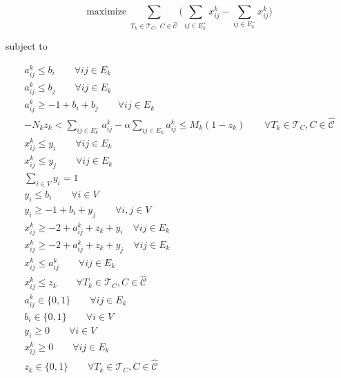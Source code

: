 \begin{equation}
	\label{eq:d-ecp-objective}
	\text{maximize} \; \sum_{ T_{k} \in \mathcal{T}_{C}, \; C \in
		\mathcal{\hat{C}} } \big( \sum^{}_{ij \in E^+_k} x_{ij}
	^{k} - \sum_{ij \in E^-_k} x_{ij} ^{k} \big)
\end{equation} \begin{center} subject to \end{center}
\begin{gather}
	\label{eq:d-ecp-a-ij-l-bi}
	a_{ij}^{k} \leq b_{i} \quad\quad \forall ij \in E_k \\
	\label{eq:d-ecp-a-ij-l-bj}
	a_{ij}^{k} \leq b_{j} \quad\quad \forall ij \in E_k \\
	\label{eq:d-ecp-a-ij-g-ijk}
	a _{ij} ^{k} \geq - 1 + b_i + b_j \quad\quad \forall ij \in E_k \\
	\label{eq:d-ecp-alpha-constraint}
	-N_{k} z_k < \sum^{}_{ij \in E^-_k} a_{ij}^{k}  - \alpha \sum^{}_{ij \in E_k}
	a_{ij} ^{k}  \leq M_k (1 - z_k) \quad\quad \forall T_{k} \in \mathcal{T} _{C}, C \in
	\hat{\mathcal{C}}\\
	\label{eq:d-ecp-edge-charikar1}
	x _{ij}^{k}  \leq y_i \quad\quad \forall ij \in E_{k} \\
	\label{eq:d-ecp-edge-charikar2}
	x _{ij} ^{k} \leq y_j \quad\quad \forall ij \in E_k \\
	\label{eq:d-ecp-vertex-charikar1}
	\sum^{}_{i \in V} y_i = 1 \\
	\label{eq:d-ecp-vertex-l-b}
	y_i \leq b_i \quad\quad \forall i \in V \\
	\label{eq:d-ecp-vertex-g-bi-yj}
	y_i \geq -1 + b_i + y_j \quad\quad \forall i,j \in V \\
	\label{eq:d-ecp-x-l-sum1}
	x_{ij}^{k} \geq -2 + a_{ij} ^{k} + z_k + y_i \quad \forall ij \in E_k \\
	\label{eq:d-ecp-x-l-sum2}
	x_{ij}^{k} \geq -2 + a_{ij} ^{k} + z_k + y_j \quad \forall ij \in E_k \\
	\label{eq:d-ecp-x-l-a}
	x_{ij} ^{k} \leq a_{ij} ^{k} \quad\quad \forall ij \in E_k \\
	\label{eq:d-ecp-x-l-z}
	x_{ij} ^{k} \leq z_k \quad\quad \forall T_{k} \in \mathcal{T} _{C}, C \in
	\hat{\mathcal{C}}  \\
	\label{eq:d-ecp-a-ij}
	a _{ij} ^{k}  \in \{0, 1\} \quad\quad \forall ij \in E_k\\
	\label{eq:d-ecp-b-i}
	b _{i} \in \{0, 1\} \quad\quad \forall i \in V \\
	\label{eq:d-ecp-y-i}
	y _{i} \geq 0 \quad\quad \forall i \in V \\
	\label{eq:d-ecp-x-ij}
	x _{ij} ^{k}  \geq 0 \quad\quad \forall ij \in E_k\\
	\label{eq:d-ecp-z-k}
	z _{k} \in \{0, 1\} \quad\quad \forall T_{k} \in \mathcal{T} _{C}, C \in
	\hat{\mathcal{C}}
\end{gather}


